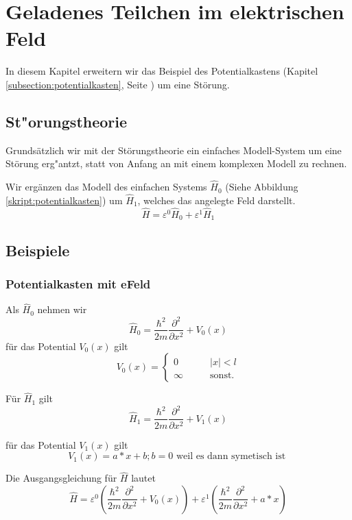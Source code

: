 \chapter{Geladenes Teilchen im elektrischen Feld\label{chapter:efeld}}
\begin{refsection}


In diesem Kapitel erweitern wir das Beispiel des Potentialkastens 
(Kapitel \ref{subsection:potentialkasten}, Seite \pageref{subsection:potentialkasten})
um eine St\"orung.

\section{ St"orungstheorie }
Grundsätzlich wir mit der St\"orungstheorie ein einfaches Modell-System um eine St\"orung
erg"antzt, statt von Anfang an mit einem komplexen Modell zu rechnen.

Wir erg\"anzen das Modell des einfachen Systems $\hat H_0$
(Siehe Abbildung \ref{skript:potentialkasten})
um $\hat H_1$, welches das angelegte Feld darstellt.
\[
\hat{H} = \varepsilon^0 \hat H_0 + \varepsilon^1 \hat H_1
\]





\section{ Beispiele }

\subsection{ Potentialkasten mit eFeld }
Als $\hat H_0$ nehmen wir
\[
  \hat H_0 = \frac{\hbar^2}{2m} \frac{\partial^2}{\partial x^2} + V_0(x)
\]
f\"ur das Potential $V_0(x)$ gilt
\[
  V_0(x)=\begin{cases}
    0       & \qquad |x|<l\\
    \infty  & \qquad\text{sonst.}
  \end{cases}
\]

F\"ur $\hat H_1$ gilt
\[
  \hat H_1 = \frac{\hbar^2}{2m} \frac{\partial^2}{\partial x^2} + V_1(x)
\]

f\"ur das Potential $V_1(x)$ gilt
\[
  V_1(x) = a*x +b ; b = 0 \text{ weil es dann symetisch ist }
\]

Die Ausgangsgleichung f\"ur $\hat{H}$ lautet
\[
  \hat{H} = \varepsilon^0 ( \frac{\hbar^2}{2m} \frac{\partial^2}{\partial x^2} + V_0(x) )
            + \varepsilon^1 ( \frac{\hbar^2}{2m} \frac{\partial^2}{\partial x^2} + a*x )
\]


\end{refsection}
